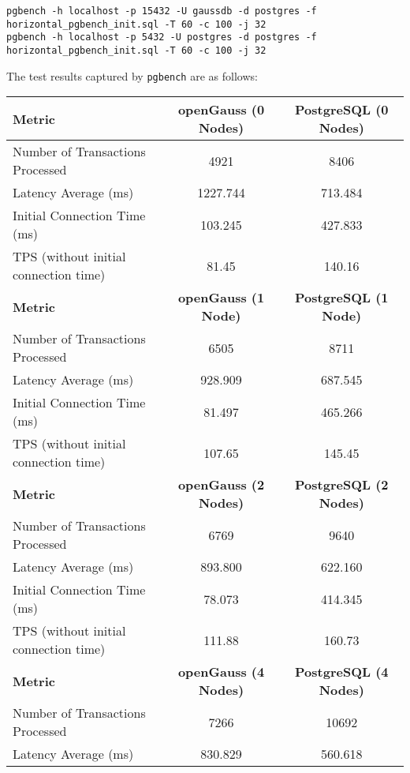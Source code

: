 \documentclass[12pt,a4paper,cs4size]{ctexart}
\begin{document}
\begin{lstlisting}[style=C++]
pgbench -h localhost -p 15432 -U gaussdb -d postgres -f horizontal_pgbench_init.sql -T 60 -c 100 -j 32
pgbench -h localhost -p 5432 -U postgres -d postgres -f horizontal_pgbench_init.sql -T 60 -c 100 -j 32
\end{lstlisting}

\newpage

The test results captured by \texttt{pgbench} are as follows:

\begin{table}[h!]
\centering
\captionsetup{labelformat=empty}
\begin{tabular}{|l|c|c|}
\hline
\textbf{Metric} & \textbf{openGauss (0 Nodes)} & \textbf{PostgreSQL (0 Nodes)} \\
\hline
Number of Transactions Processed & 4921 & 8406 \\
\hline
Latency Average (ms) & 1227.744 & 713.484 \\
\hline
Initial Connection Time (ms) & 103.245 & 427.833 \\
\hline
TPS (without initial connection time) & 81.45 & 140.16 \\
\hline
\hline
\textbf{Metric} & \textbf{openGauss (1 Node)} & \textbf{PostgreSQL (1 Node)} \\
\hline
Number of Transactions Processed & 6505 & 8711 \\
\hline
Latency Average (ms) & 928.909 & 687.545 \\
\hline
Initial Connection Time (ms) & 81.497 & 465.266 \\
\hline
TPS (without initial connection time) & 107.65 & 145.45 \\
\hline
\hline
\textbf{Metric} & \textbf{openGauss (2 Nodes)} & \textbf{PostgreSQL (2 Nodes)} \\
\hline
Number of Transactions Processed & 6769 & 9640 \\
\hline
Latency Average (ms) & 893.800 & 622.160 \\
\hline
Initial Connection Time (ms) & 78.073 & 414.345 \\
\hline
TPS (without initial connection time) & 111.88 & 160.73 \\
\hline
\hline
\textbf{Metric} & \textbf{openGauss (4 Nodes)} & \textbf{PostgreSQL (4 Nodes)} \\
\hline
Number of Transactions Processed & 7266 & 10692 \\
\hline
Latency Average (ms) & 830.829 & 560.618 \\
\hline

\end{tabular}
\end{table}
\end{document}
